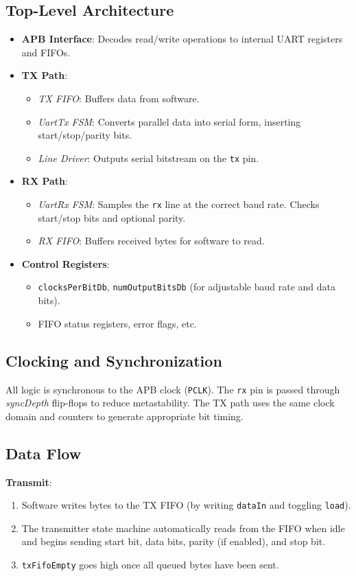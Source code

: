 \subsection{Top-Level Architecture}
\begin{itemize}
  \item \textbf{APB Interface}: Decodes read/write operations to internal UART registers and FIFOs.
  \item \textbf{TX Path}:
  \begin{itemize}
    \item \textit{TX FIFO}: Buffers data from software.
    \item \textit{UartTx FSM}: Converts parallel data into serial form, inserting start/stop/parity bits.
    \item \textit{Line Driver}: Outputs serial bitstream on the \texttt{tx} pin.
  \end{itemize}
  \item \textbf{RX Path}:
  \begin{itemize}
    \item \textit{UartRx FSM}: Samples the \texttt{rx} line at the correct baud rate. Checks start/stop bits and optional parity.
    \item \textit{RX FIFO}: Buffers received bytes for software to read.
  \end{itemize}
  \item \textbf{Control Registers}: 
    \begin{itemize}
      \item \texttt{clocksPerBitDb}, \texttt{numOutputBitsDb} (for adjustable baud rate and data bits).
      \item FIFO status registers, error flags, etc.
    \end{itemize}
\end{itemize}

\subsection{Clocking and Synchronization}
All logic is synchronous to the APB clock (\texttt{PCLK}). The \texttt{rx} pin is passed through \textit{syncDepth} flip-flops to reduce metastability. The TX path uses the same clock domain and counters to generate appropriate bit timing.

\subsection{Data Flow}
\textbf{Transmit}:
\begin{enumerate}
  \item Software writes bytes to the TX FIFO (by writing \texttt{dataIn} and toggling \texttt{load}).
  \item The transmitter state machine automatically reads from the FIFO when idle and begins sending start bit, data bits, parity (if enabled), and stop bit.
  \item \texttt{txFifoEmpty} goes high once all queued bytes have been sent.
\end{enumerate}

